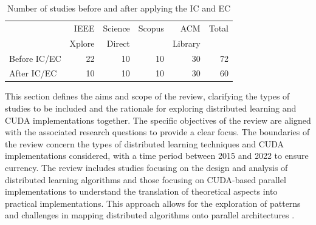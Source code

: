 \begin{table}[htbp]
	\centering
	\caption{\footnotesize Number of studies before and after applying the IC and EC}
	\label{tab:criteria}
	\begin{tabular}{lrrrrr}
		\hline
		                           & \footnotesize IEEE   & \footnotesize Science & \footnotesize Scopus & \footnotesize ACM     & \footnotesize Total \\
		                           & \footnotesize Xplore & \footnotesize Direct  &                      & \footnotesize Library &                     \\
		\hline
		\footnotesize Before IC/EC & 22                   & 10                    & 10                   & 30                    & 72                  \\
		\footnotesize After IC/EC  & 10                   & 10                    & 10                   & 30                    & 60                  \\
		\hline
	\end{tabular}
\end{table}


This section defines the aims and scope of the review, clarifying the types of studies to be
included and the rationale for exploring distributed learning and CUDA implementations together.
The specific objectives of the review are aligned with the associated research questions to provide
a clear focus. The boundaries of the review concern the types of distributed learning techniques
and CUDA implementations considered, with a time period between 2015 and 2022 to ensure currency.
The review includes studies focusing on the design and analysis of distributed learning algorithms
and those focusing on CUDA-based parallel implementations to understand the translation of
theoretical aspects into practical implementations. This approach allows for the exploration of
patterns and challenges in mapping distributed algorithms onto parallel architectures
.

